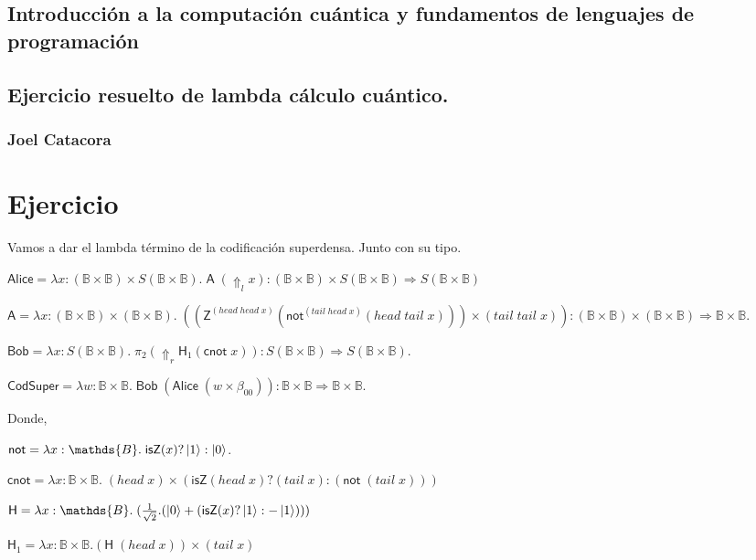 \documentclass[a4paper,11pt]{article}
\title{}
\author{}
\begin{document}
\maketitle 

\thispagestyle{empty}
\begin{center}
\section*{Introducción a  la computación cuántica y fundamentos de lenguajes de programación} 
\subsection*{Ejercicio resuelto de lambda cálculo cuántico.}
\subsubsection*{Joel Catacora}

\end{center}

\newpage{\pagestyle{empty}\cleardoublepage}

\newpage

\section*
{Ejercicio}

Vamos a dar el lambda término de la codificación superdensa. Junto con su tipo.

$ \textsf{Alice} = \lambda x : (\mathds{B} \times \mathds{B}) \times S (\mathds{B} \times \mathds{B}). \; \textsf{A} \; (\Uparrow_{l} x)
 : (\mathds{B} \times  \mathds{B}) \times S(\mathds{B} \times \mathds{B}) \Rightarrow S(\mathds{B} \times \mathds{B})$


$ \textsf{A} = \lambda x: (\mathds{B} \times \mathds{B}) \times (\mathds{B} \times \mathds{B}). \; ((\textsf{Z}^{(head \; head \; x)} 
  (\textsf{not}^{(tail \; head \; x)} (head \; tail \; x))) \times (tail \; tail \; x)) 
  : (\mathds{B} \times  \mathds{B}) \times (\mathds{B} \times  \mathds{B}) 
  \Rightarrow \mathds{B} \times \mathds{B}.$

$ \textsf{Bob} = \lambda x : S(\mathds{B} \times \mathds{B}). \; \pi_{2} (\Uparrow_{r} \textsf{H}_{1} (\textsf{cnot} \; x)) 
  : S(\mathds{B} \times \mathds{B}) \Rightarrow S(\mathds{B} \times \mathds{B}).$

$ \textsf{CodSuper} = \lambda w : \mathds{B} \times \mathds{B}. \; \textsf{Bob} \; (\textsf{Alice} \; (w \times \beta_{00}) ) 
  : \mathds{B} \times \mathds{B} \Rightarrow \mathds{B} \times \mathds{B}.$

Donde,

$ \textsf{not} = \lambda x: \mathds{B}. \; \textsf{isZ}(x) ? \ket{1} : \ket{0}$.

$ \textsf{cnot} = \lambda x: \mathds{B} \times \mathds{B}. \; ( head \; x) \times (\textsf{isZ}( head \; x) ?
  (tail \; x) : (\textsf{not} \; (tail \; x)) )$

$ \textsf{H} = \lambda x : \mathds{B}. \; (\frac{1}{\sqrt{2}}.(\ket{0} + (\textsf{isZ}(x) ? \ket{1} : -\ket{1}))) $

$ \textsf{H}_{1} = \lambda x : \mathds{B} \times \mathds{B} . (\textsf{H} \; (head \; x)) \times (tail \; x)$
\end{document}
